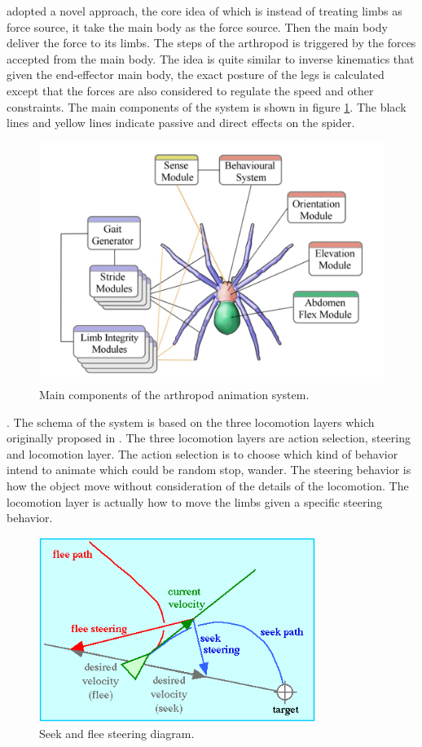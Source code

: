 \cite{thesis} adopted a novel approach, the core idea of which is instead of treating limbs as force source, it take the main body as the force source. Then the main body deliver the force to its limbs. The steps of the arthropod is triggered by the forces accepted from the main body. The idea is quite similar to inverse kinematics that given the end-effector main body, the exact posture of the legs is calculated except that the forces are also considered to regulate the speed and other constraints. The main components of the system is shown in figure \ref{fig:spider_module}. The black lines and yellow lines indicate passive and direct effects on the spider.
\begin{figure}[ht!]
\centering
\includegraphics[height=8 cm]{figures/spider_module.png}
\caption{Main components of the arthropod animation system. \protect\cite{thesis}}
\label{fig:spider_module}
\end{figure}.
The schema of the system is based on the three locomotion layers which originally proposed in \cite{steering}. The three locomotion layers are action selection, steering and locomotion layer. The action selection is to choose which kind of behavior intend to animate which could be random stop, wander. The steering behavior is how the object move without consideration of the details of the locomotion. The locomotion layer is actually how to move the limbs given a specific steering behavior. 
\begin{figure}[ht!]
\centering
\includegraphics[height=6cm]{figures/seek.png}
\caption{Seek and flee steering diagram. \protect\cite{steeringImage}}
\label{fig:seek}
\end{figure}

